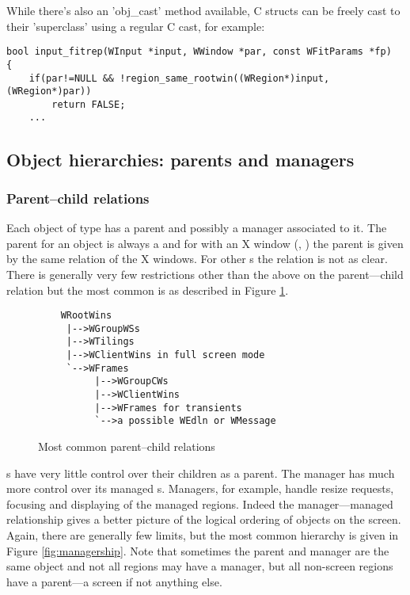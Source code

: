 While there's also an 'obj\_cast' method available, C structs can be freely 
cast to their 'superclass' using a regular C cast, for example:

\begin{verbatim}
bool input_fitrep(WInput *input, WWindow *par, const WFitParams *fp)
{
    if(par!=NULL && !region_same_rootwin((WRegion*)input, (WRegion*)par))
        return FALSE;
    ...
\end{verbatim}

\subsection{Object hierarchies:  parents and managers}

\subsubsection{Parent--child relations}
Each object of type  has a parent and possibly a manager
associated to it. The parent for an object is always a 
 and for  with an X window (,
) the parent  is given by the same relation of
the X windows. For other s the relation is not as clear.
There is generally very few restrictions other than the above on the
parent---child relation but the most common is as described in
Figure \ref{fig:parentship}.

\begin{figure}
\begin{htmlonly}
\docode %
\end{htmlonly}
\begin{verbatim}
    WRootWins
     |-->WGroupWSs
     |-->WTilings
     |-->WClientWins in full screen mode
     `-->WFrames
          |-->WGroupCWs
          |-->WClientWins
          |-->WFrames for transients
          `-->a possible WEdln or WMessage
\end{verbatim}
\caption{Most common parent--child relations}
\label{fig:parentship}
\end{figure}

s have very little control over their children as a parent.
The manager  has much more control over its
managed s. Managers, for example, handle resize requests,
focusing and displaying of the managed regions. Indeed the manager---managed
relationship gives a better picture of the logical ordering of objects on
the screen. Again, there are generally few limits, but the most common
hierarchy is given in Figure \ref{fig:managership}. Note that sometimes
the parent and manager are the same object and not all regions may have
a manager, but all non-screen regions have a parent---a screen if not 
anything else.

